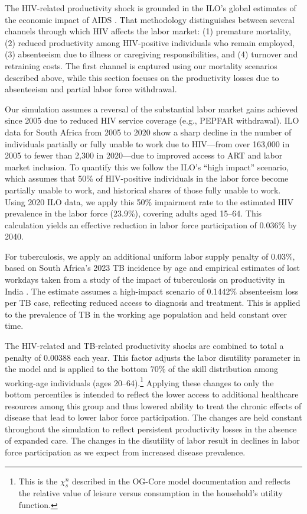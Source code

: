 \documentclass[letterpaper,12pt]{article}
\theoremstyle{definition}
\begin{document}
\begin{spacing}{1.5}
The HIV-related productivity shock is grounded in the ILO's global estimates of the economic impact of AIDS \citep{ILO2018}. That methodology distinguishes between several channels through which HIV affects the labor market: (1) premature mortality, (2) reduced productivity among HIV-positive individuals who remain employed, (3) absenteeism due to illness or caregiving responsibilities, and (4) turnover and retraining costs. The first channel is captured using our mortality scenarios described above, while this section focuses on the productivity losses due to absenteeism and partial labor force withdrawal.

Our simulation assumes a reversal of the substantial labor market gains achieved since 2005 due to reduced HIV service coverage (e.g., PEPFAR withdrawal). ILO data for South Africa from 2005 to 2020 show a sharp decline in the number of individuals partially or fully unable to work due to HIV—from over 163,000 in 2005 to fewer than 2,300 in 2020—due to improved access to ART and labor market inclusion. To quantify this we follow the ILO's ``high impact'' scenario, which assumes that 50\% of HIV-positive individuals in the labor force become partially unable to work, and historical shares of those fully unable to work. Using 2020 ILO data, we apply this 50\% impairment rate to the estimated HIV prevalence in the labor force (23.9\%), covering adults aged 15–64. This calculation yields an effective reduction in labor force participation of 0.036\% by 2040.

For tuberculosis, we apply an additional uniform labor supply penalty of 0.03\%, based on South Africa's 2023 TB incidence by age and empirical estimates of lost workdays taken from a study of the impact of tuberculosis on productivity in India \citep{Keogh2024}. The estimate assumes a high-impact scenario of 0.1442\% absenteeism loss per TB case, reflecting reduced access to diagnosis and treatment. This is applied to the prevalence of TB in the working age population and held constant over time.

The HIV-related and TB-related productivity shocks are combined to total a penalty of 0.00388 each year. This factor adjusts the labor disutility parameter in the model and is applied to the bottom 70\% of the skill distribution among working-age individuals (ages 20–64).\footnote{This is the $\chi^n_s$ described in the OG-Core model documentation and reflects the relative value of leisure versus consumption in the household's utility function.} Applying these changes to only the bottom percentiles is intended to reflect the lower access to additional healthcare resources among this group and thus lowered ability to treat the chronic effects of disease that lead to lower labor force participation.  The changes are held constant throughout the simulation to reflect persistent productivity losses in the absence of expanded care.  The changes in the disutility of labor result in declines in labor force participation as we expect from increased disease prevalence.


\end{spacing}
\end{document}
